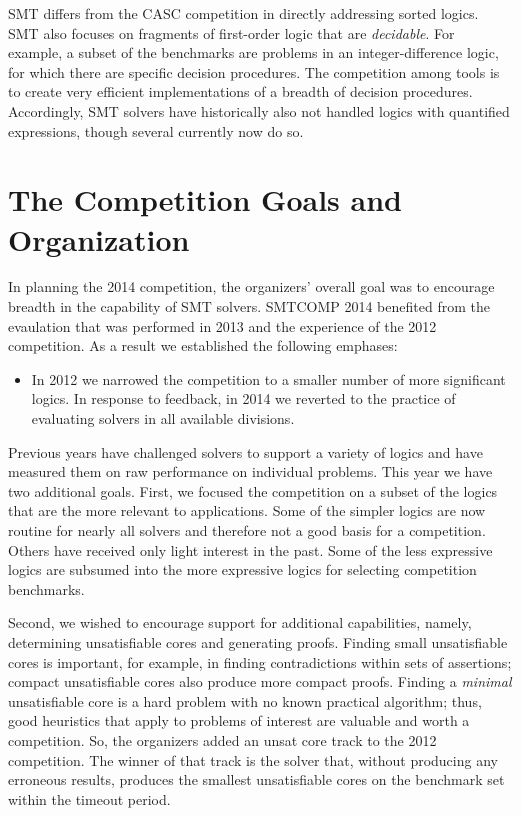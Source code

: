 \documentclass{llncs}
\begin{document}
SMT differs from the CASC competition \cite{TBD} in directly addressing sorted logics. SMT also focuses on fragments of first-order logic that are \textit{decidable}. For example, a subset of the benchmarks are problems in an integer-difference logic, for which there are specific decision procedures. The competition among tools is to create very efficient implementations of a breadth of decision procedures. Accordingly, SMT solvers have historically also not handled logics with quantified expressions, though several currently now do so.

\section{The Competition Goals and Organization}

In planning the 2014 competition, the organizers' overall goal was to encourage breadth
in the capability of SMT solvers. SMTCOMP 2014 benefited from the evaulation that was performed in 2013 and the experience of the 2012 competition. As a result we established the following emphases:
\begin{itemize}
\item In 2012 we narrowed the competition to a smaller number of more significant logics. In response to feedback, in 2014 we reverted to the practice of evaluating solvers in all available divisions.


\end{itemize}

Previous years have challenged solvers to support a variety of logics and
have measured them on raw performance on individual problems. This year we have two additional goals. First, we
focused the competition on a subset of the logics that are the more relevant to applications. Some of the 
simpler logics are now routine for nearly all solvers and therefore not a good basis for a competition. Others have 
received only light interest in the past. Some of the less expressive logics are subsumed into the more expressive logics
for selecting competition benchmarks.

Second, we
wished to encourage support for additional capabilities, namely, determining unsatisfiable cores and generating proofs.
Finding small unsatisfiable cores is important, for example, in finding contradictions within sets of assertions; compact unsatisfiable cores also produce more compact proofs. Finding a {\em minimal} unsatisfiable core is a hard problem with no known practical algorithm;
thus, good heuristics that apply to problems of interest are valuable and worth a competition. So, the organizers added
an unsat core track to the 2012 competition. The winner of that track is the solver that, without producing any erroneous results, produces the smallest unsatisfiable cores on the benchmark set within the timeout period.
\end{document}
